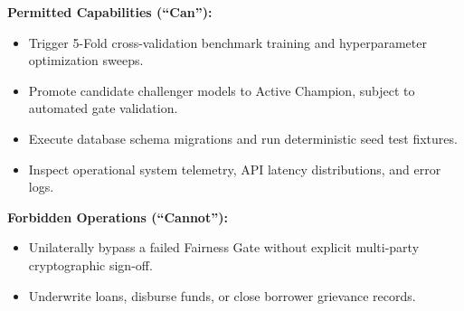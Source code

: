 \vspace{0.2cm}
\noindent\textbf{Permitted Capabilities (``Can''):}
\begin{itemize}[leftmargin=1.5em, itemsep=1pt]
  \item Trigger 5-Fold cross-validation benchmark training and hyperparameter optimization sweeps.
  \item Promote candidate challenger models to Active Champion, subject to automated gate validation.
  \item Execute database schema migrations and run deterministic seed test fixtures.
  \item Inspect operational system telemetry, API latency distributions, and error logs.
\end{itemize}

\noindent\textbf{Forbidden Operations (``Cannot''):}
\begin{itemize}[leftmargin=1.5em, itemsep=1pt]
  \item Unilaterally bypass a failed Fairness Gate without explicit multi-party cryptographic sign-off.
  \item Underwrite loans, disburse funds, or close borrower grievance records.
\end{itemize}
